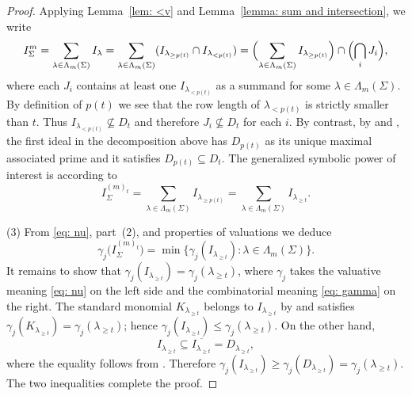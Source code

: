 \documentclass[11pt, reqno]{amsart}
\numberwithin{equation}{section}
\theoremstyle{definition}
\begin{document}
\begin{proof}
Applying Lemma~\ref{lem: <v} and Lemma~\ref{lemma: sum and intersection}, we write
\[
I_\Sigma^m =  \sum_{\lambda \in \Lambda_m(\Sigma)} I_\lambda
=\sum_{\lambda\in\Lambda_m(\Sigma)}(I_{\lambda_{\ge p(t)}}\cap I_{\lambda_{<  p(t)}})
=\Bigl(\sum_{\lambda\in\Lambda_m(\Sigma)} I_{\lambda_{\ge p(t)}}\Bigr)\cap\Bigl(\bigcap_i J_i\Bigr),
\]
where each $J_i$ contains at least one $I_{\lambda_{< p(t)}}$  as a summand for some $\lambda \in \Lambda_m(\Sigma)$.  By definition of $p(t)$ we see that the row length of $\lambda_{< p(t)}$ is strictly smaller than $t$. Thus $I_{\lambda_{< p(t)}}\not\subseteq D_t$ and therefore $J_i\not\subseteq D_t$ for each $i$. By contrast,  by  and , the first ideal in the decomposition above has $D_{p(t)}$ as its unique maximal associated prime and it satisfies $D_{p(t)}\subseteq D_t$.
The generalized symbolic power of interest is according to 
 $$I_\Sigma^{(m)_t}= \sum_{\lambda \in \Lambda_m(\Sigma)}  I_{\lambda_{\geq p(t)}} = \sum_{\lambda \in \Lambda_m(\Sigma)}  I_{\lambda_{\geq t}} .$$

(3) From \eqref{eq: nu}, part~(2), and properties of valuations we deduce
\[
\gamma_j\bigl(I_\Sigma^{(m)_t}\bigr)
 =\min\{\gamma_j(I_{\lambda_{\geq t}}):\lambda\in\Lambda_m(\Sigma)\}.
\]
It remains to show that $\gamma_j(I_{\lambda_{\geq t}})=\gamma_j(\lambda_{\geq t})$, where $\gamma_j$ takes the valuative meaning  \eqref{eq: nu} on the left side and the combinatorial meaning \eqref{eq: gamma} on the right. The standard monomial $K_{\lambda_{\geq t}}$ belongs to $I_{\lambda_{\geq t}}$ by  and satisfies
$\gamma_j(K_{\lambda_{\geq t}})=\gamma_j(\lambda_{\geq t})$; hence
$\gamma_j(I_{\lambda_{\geq t}})\leq\gamma_j(\lambda_{\geq t})$.
On the other hand,
\[
I_{\lambda_{\geq t}}\subseteq\overline{I_{\lambda_{\geq t}}}=D_{\lambda_{\geq t}},
\]
where the equality follows from \cite[Theorem 8.1]{deconcini1980young}. Therefore
$\gamma_j(I_{\lambda_{\geq t}})\geq\gamma_j(D_{\lambda_{\geq t}})=\gamma_j(\lambda_{\geq t})$.
The two inequalities complete the proof.
	\end{proof}
\end{document}
